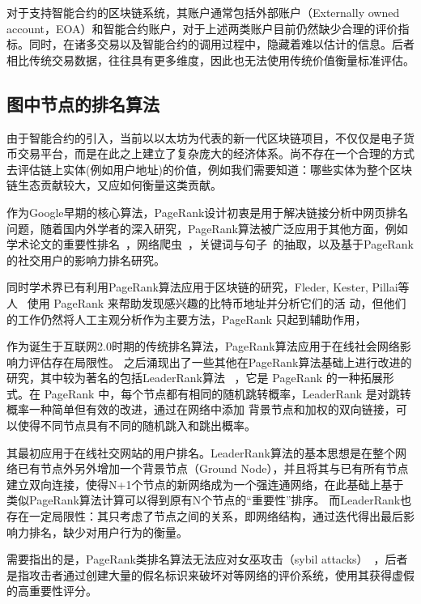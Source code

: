 对于支持智能合约的区块链系统，其账户通常包括外部账户（Externally owned account，EOA）和智能合约账户，对于上述两类账户目前仍然缺少合理的评价指标。同时，在诸多交易以及智能合约的调用过程中，隐藏着难以估计的信息。后者相比传统交易数据，往往具有更多维度，因此也无法使用传统价值衡量标准评估。





\subsection{图中节点的排名算法}
由于智能合约的引入，当前以以太坊为代表的新一代区块链项目，不仅仅是电子货币交易平台，而是在此之上建立了复杂庞大的经济体系。尚不存在一个合理的方式去评估链上实体(例如用户地址)的价值，例如我们需要知道：哪些实体为整个区块链生态贡献较大，又应如何衡量这类贡献。

作为Google早期的核心算法，PageRank设计初衷是用于解决链接分析中网页排名问题，随着国内外学者的深入研究，PageRank算法被广泛应用于其他方面，例如学术论文的重要性排名~\cite{}，网络爬虫~\cite{}，关键词与句子~\cite{}的抽取，以及基于PageRank的社交用户的影响力排名研究。

同时学术界已有利用PageRank算法应用于区块链的研究，Fleder, Kester, Pillai等人~\cite{Fleder2015} 使用 PageRank 来帮助发现感兴趣的比特币地址并分析它们的活 动，但他们的工作仍然将人工主观分析作为主要方法，PageRank 只起到辅助作用，

作为诞生于互联网2.0时期的传统排名算法，PageRank算法应用于在线社会网络影响力评估存在局限性。
之后涌现出了一些其他在PageRank算法基础上进行改进的研究，其中较为著名的包括LeaderRank算法 ~\cite{Li2014}，它是 PageRank 的一种拓展形式。在 PageRank 中，每个节点都有相同的随机跳转概率，LeaderRank 是对跳转概率一种简单但有效的改进，通过在网络中添加 背景节点和加权的双向链接，可以使得不同节点具有不同的随机跳入和跳出概率。

其最初应用于在线社交网站的用户排名。LeaderRank算法的基本思想是在整个网络已有节点外另外增加一个背景节点（Ground Node），并且将其与已有所有节点建立双向连接，使得N+1个节点的新网络成为一个强连通网络，在此基础上基于类似PageRank算法计算可以得到原有N个节点的“重要性”排序。
而LeaderRank也存在一定局限性：其只考虑了节点之间的关系，即网络结构，通过迭代得出最后影响力排名，缺少对用户行为的衡量。

需要指出的是，PageRank类排名算法无法应对女巫攻击（sybil attacks）~\cite{cheng2006manipulability}，后者是指攻击者通过创建大量的假名标识来破坏对等网络的评价系统，使用其获得虚假的高重要性评分。


